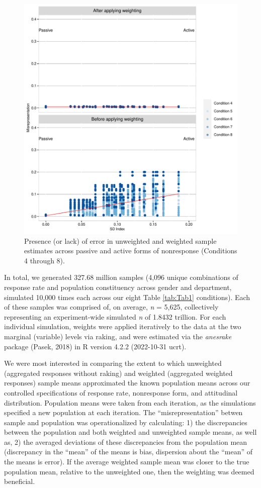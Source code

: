 \documentclass[
  man,mask]{apa7}
\begin{document}
\begin{figure}
\centering
\includegraphics{Simulation-paper2-20200207_files/figure-latex/Together6-1.pdf}
\caption{\label{fig:Together6}Presence (or lack) of error in unweighted and weighted sample estimates across passive and active forms of nonresponse (Conditions 4 through 8).}
\end{figure}

In total, we generated 327.68 million samples (4,096 unique combinations of response rate and population constituency across gender and department, simulated 10,000 times each across our eight Table \ref{tab:Tab1} conditions). Each of these samples was comprised of, on average, \emph{n} = 5,625, collectively representing an experiment-wide simulated \emph{n} of 1.8432 trillion. For each individual simulation, weights were applied iteratively to the data at the two marginal (variable) levels via raking, and were estimated via the \emph{anesrake} package (Pasek, 2018) in R version 4.2.2 (2022-10-31 ucrt).

We were most interested in comparing the extent to which unweighted (aggregated responses without raking) and weighted (aggregated weighted responses) sample means approximated the known population means across our controlled specifications of response rate, nonresponse form, and attitudinal distribution. Population means were taken from each iteration, as the simulations specified a new population at each iteration. The ``misrepresentation'' betwen sample and population was operationalized by calculating: 1) the discrepancies between the population and both weighted and unweighted sample means, as well as, 2) the averaged deviations of these discrepancies from the population mean (discrepancy in the ``mean'' of the means is bias, dispersion about the ``mean'' of the means is error). If the average weighted sample mean was closer to the true population mean, relative to the unweighted one, then the weighting was deemed beneficial.
\end{document}
